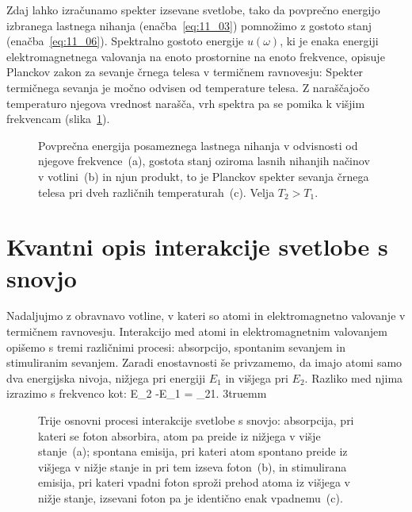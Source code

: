 Zdaj lahko izračunamo spekter izsevane svetlobe, tako da povprečno 
energijo izbranega lastnega nihanja (enačba~\ref{eq:11_03}) 
pomnožimo z gostoto stanj (enačba~\ref{eq:11_06}). 
Spektralno gostoto energije $u(\omega)$, ki je enaka energiji 
elektromagnetnega valovanja na enoto prostornine na enoto frekvence, 
opisuje Planckov zakon za sevanje črnega telesa v termičnem ravnovesju:
Spekter termičnega sevanja je močno odvisen od temperature telesa. Z naraščajočo
temperaturo njegova vrednost narašča, vrh spektra pa se pomika k višjim
frekvencam (slika~\ref{fig:11_Planck}).
\begin{figure}[h!]
\centering
\def\svgwidth{140truemm} 

\caption{Povprečna energija posameznega lastnega nihanja v odvisnosti
od njegove frekvence~(a), gostota stanj  oziroma lasnih nihanjih načinov
v votlini~(b) in njun produkt, to je Planckov spekter sevanja
črnega telesa pri dveh različnih temperaturah~(c). Velja $T_2>T_1$.
}
\label{fig:11_Planck}
\end{figure}

\section{Kvantni opis interakcije svetlobe s snovjo}
Nadaljujmo z obravnavo votline, v kateri so atomi 
in elektromagnetno valovanje v termičnem ravnovesju. 
Interakcijo med atomi in elektromagnetnim valovanjem 
opišemo s tremi različnimi procesi: absorpcijo, spontanim
sevanjem in stimuliranim sevanjem. Zaradi enostavnosti še
privzamemo, da imajo atomi samo dva energijska nivoja, nižjega pri energiji
$E_1$ in višjega pri $E_2$. Razliko med njima izrazimo s frekvenco kot:
\beq
E_2 -E_1 = \hslash \omega_{21}.
\label{eq:11_07}
\eeq
\vglue3truemm
\begin{figure}[h!]
\centering
\def\svgwidth{140truemm} 

\caption{Trije osnovni procesi interakcije svetlobe s snovjo:
absorpcija, pri kateri se foton absorbira, atom pa preide iz nižjega v višje stanje~(a); spontana emisija, pri kateri atom spontano preide iz višjega v nižje stanje in pri 
tem izseva foton~(b), in stimulirana emisija, pri kateri vpadni foton sproži prehod
atoma iz višjega v nižje stanje, izsevani foton pa je identično enak vpadnemu~(c).
}
\label{fig:11_procesi}
\end{figure}


